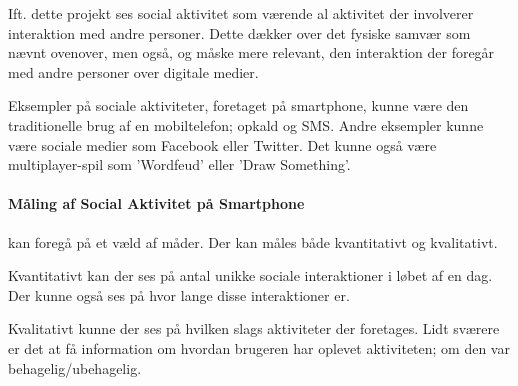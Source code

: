 Ift. dette projekt ses social aktivitet som værende al aktivitet der involverer interaktion med andre personer.
Dette dækker over det fysiske samvær som nævnt ovenover, men også, og måske mere relevant, den interaktion der foregår med andre personer over digitale medier.

Eksempler på sociale aktiviteter, foretaget på smartphone, kunne være den traditionelle brug af en mobiltelefon; opkald og SMS.
Andre eksempler kunne være sociale medier som Facebook eller Twitter.
Det kunne også være multiplayer-spil som 'Wordfeud' eller 'Draw Something'.

\paragraph{Måling af Social Aktivitet på Smartphone} kan foregå på et væld af måder.
Der kan måles både kvantitativt og kvalitativt.

Kvantitativt kan der ses på antal unikke sociale interaktioner i løbet af en dag.
Der kunne også ses på hvor lange disse interaktioner er.

Kvalitativt kunne der ses på hvilken slags aktiviteter der foretages.
Lidt sværere er det at få information om hvordan brugeren har oplevet aktiviteten; om den var behagelig/ubehagelig.
